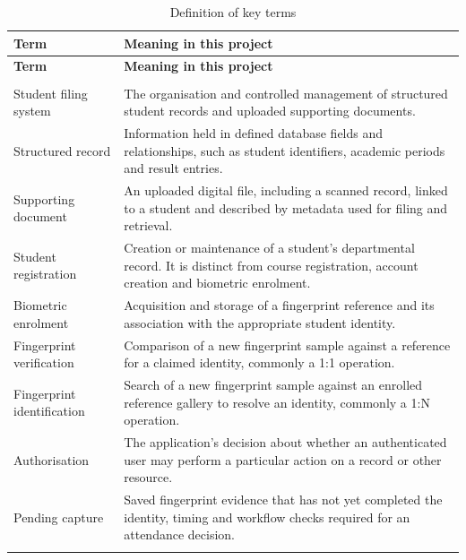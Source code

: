 \begingroup
\singlespacing%
\setlength{\tabcolsep}{4pt}
\begin{longtable}{@{}>{\RaggedRight\arraybackslash}p{}>{\RaggedRight\arraybackslash}p{}@{}}
\caption{Definition of key terms}\label{tab:1-terms}\\
\toprule
\textbf{Term} & \textbf{Meaning in this project} \\
\midrule
\endfirsthead%
\toprule
\textbf{Term} & \textbf{Meaning in this project} \\
\midrule
\endhead%
\midrule
\multicolumn{2}{r}{Continued on next page}\\
\endfoot%
\bottomrule
\endlastfoot%
Student filing system & The organisation and controlled management of structured student records and uploaded supporting documents. \\ \addlinespace
Structured record & Information held in defined database fields and relationships, such as student identifiers, academic periods and result entries. \\ \addlinespace
Supporting document & An uploaded digital file, including a scanned record, linked to a student and described by metadata used for filing and retrieval. \\ \addlinespace
Student registration & Creation or maintenance of a student's departmental record. It is distinct from course registration, account creation and biometric enrolment. \\ \addlinespace
Biometric enrolment & Acquisition and storage of a fingerprint reference and its association with the appropriate student identity. \\ \addlinespace
Fingerprint verification & Comparison of a new fingerprint sample against a reference for a claimed identity, commonly a 1:1 operation. \\ \addlinespace
Fingerprint identification & Search of a new fingerprint sample against an enrolled reference gallery to resolve an identity, commonly a 1:N operation. \\ \addlinespace
Authorisation & The application's decision about whether an authenticated user may perform a particular action on a record or other resource. \\ \addlinespace
Pending capture & Saved fingerprint evidence that has not yet completed the identity, timing and workflow checks required for an attendance decision. \\ \addlinespace
\end{longtable}
\endgroup
